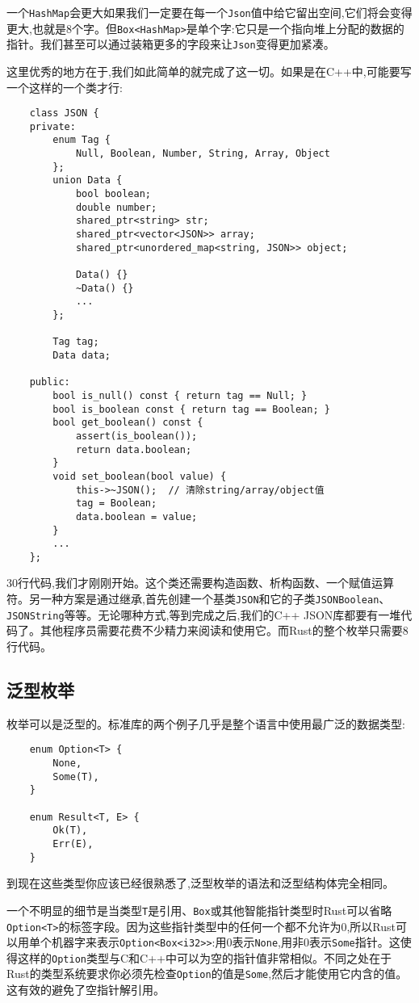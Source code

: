 一个\texttt{HashMap}会更大如果我们一定要在每一个\texttt{Json}值中给它留出空间,它们将会变得更大,也就是8个字。但\texttt{Box<HashMap>}是单个字:它只是一个指向堆上分配的数据的指针。我们甚至可以通过装箱更多的字段来让\texttt{Json}变得更加紧凑。

这里优秀的地方在于,我们如此简单的就完成了这一切。如果是在C++中,可能要写一个这样的一个类才行:
\begin{verbatim}
    class JSON {
    private:
        enum Tag {
            Null, Boolean, Number, String, Array, Object
        };
        union Data {
            bool boolean;
            double number;
            shared_ptr<string> str;
            shared_ptr<vector<JSON>> array;
            shared_ptr<unordered_map<string, JSON>> object;

            Data() {}
            ~Data() {}
            ...
        };
        
        Tag tag;
        Data data;
    
    public:
        bool is_null() const { return tag == Null; }
        bool is_boolean const { return tag == Boolean; }
        bool get_boolean() const {
            assert(is_boolean());
            return data.boolean;
        }
        void set_boolean(bool value) {
            this->~JSON();  // 清除string/array/object值
            tag = Boolean;
            data.boolean = value;
        }
        ...
    };
\end{verbatim}

30行代码,我们才刚刚开始。这个类还需要构造函数、析构函数、一个赋值运算符。另一种方案是通过继承,首先创建一个基类\texttt{JSON}和它的子类\texttt{JSONBoolean}、\texttt{JSONString}等等。无论哪种方式,等到完成之后,我们的C++ JSON库都要有一堆代码了。其他程序员需要花费不少精力来阅读和使用它。而Rust的整个枚举只需要8行代码。

\subsection{泛型枚举}\label{GenEnum}
枚举可以是泛型的。标准库的两个例子几乎是整个语言中使用最广泛的数据类型:
\begin{verbatim}
    enum Option<T> {
        None,
        Some(T),
    }

    enum Result<T, E> {
        Ok(T),
        Err(E),
    }
\end{verbatim}

到现在这些类型你应该已经很熟悉了,泛型枚举的语法和泛型结构体完全相同。

一个不明显的细节是当类型\texttt{T}是引用、\texttt{Box}或其他智能指针类型时Rust可以省略\texttt{Option<T>}的标签字段。因为这些指针类型中的任何一个都不允许为0,所以Rust可以用单个机器字来表示\texttt{Option<Box<i32>>}:用0表示\texttt{None},用非0表示\texttt{Some}指针。这使得这样的\texttt{Option}类型与C和C++中可以为空的指针值非常相似。不同之处在于Rust的类型系统要求你必须先检查\texttt{Option}的值是\texttt{Some},然后才能使用它内含的值。这有效的避免了空指针解引用。

